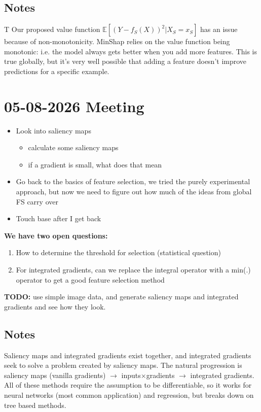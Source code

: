 \documentclass{article}
\newcounter{question}[section]
\newcommand{\E}{\mathbb{E}}
\begin{document}
\subsection{Notes}
T
Our proposed value function $\E[(Y-f_S(X))^2 |X_S = x_S]$ has an issue because of non-monotonicity. MinShap relies on the value function being monotonic: i.e. the model always gets better when you add more features. This is true globally, but it's very well possible that adding a feature doesn't improve predictions for a specific example. 

\section{05-08-2026 Meeting}
\begin{itemize}
    \item Look into saliency maps
    \begin{itemize}
        \item calculate some saliency maps
        \item if a gradient is small, what does that mean
    \end{itemize}
    \item Go back to the basics of feature selection, we tried the purely experimental approach, but now we need to figure out how much of the ideas from global FS carry over
    \item Touch base after I get back
\end{itemize}

\textbf{ We have two open questions: }
\begin{enumerate}\color{blue}
    \item How to determine the threshold for selection (statistical question)

    \item For integrated gradients, can we replace the integral operator with a min(.) operator to get a good feature selection method
\end{enumerate}

\textbf{\color{red} TODO:} use simple image data, and generate saliency maps and integrated gradients and see how they look.

\subsection{Notes}
Saliency maps and integrated gradients exist together, and integrated gradients seek to solve a problem created by saliency maps. The natural progression is saliency maps (vanilla gradients) $\rightarrow$ inputs$\times$gradients $\rightarrow$ integrated gradients. All of these methods require the assumption to be differentiable, so it works for neural networks (most common application) and regression, but breaks down on tree based methods. 
\end{document}
